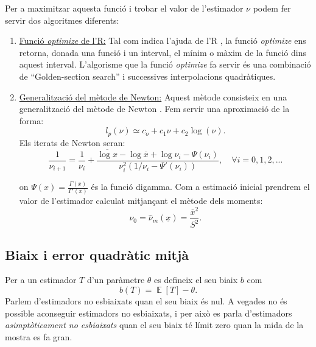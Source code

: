 \documentclass[12pt, catalan]{article}
\numberwithin{table}{section}
\numberwithin{figure}{section}
\numberwithin{equation}{section}
\DeclareMathOperator{\E}{\mathbb{E}}
\begin{document}
Per a maximitzar aquesta funció i trobar el valor de l'estimador $\nu$ podem fer servir dos algoritmes diferents:
\begin{enumerate}
  \item  \underline{Funció \textit{optimize} de l'R:}
  Tal com indica l'ajuda de l'R \cite{Rhelp}, la funció \textit{optimize} ens retorna, donada una funció i un interval, el mínim o màxim de la funció dins aquest interval. L'algorisme que la funció \textit{optimize} fa servir és una combinació de ``Golden-section search'' i successives interpolacions quadràtiques.

  
  \item  \underline{Generalització del mètode de Newton:}
  Aquest mètode consisteix en una generalització del mètode de Newton \cite{method}.
  Fem servir una aproximació de la forma:
  \begin{equation}
       l_p(\nu)\simeq c_o+c_1\nu+c_2\log(\nu).
  \end{equation}
  Els iterats de Newton seran:
  \begin{equation}
      \frac{1}{\nu_{i+1}}=\frac{1}{\nu_i}+\frac{\overline{\log x}-\log\overline{x}+\log\nu_i-\Psi(\nu_i)}{\nu_i^2(1/\nu_i-\Psi'(\nu_i))},\quad\forall i=0,1,2,...
      \label{Newton}
  \end{equation}

 on $\Psi(x)=\frac{\Gamma(x)}{\Gamma'(x)}$ és la funció digamma.
 Com a estimació inicial prendrem el valor de l'estimador calculat mitjançant el mètode dels moments: %
 \begin{equation*}
     \nu_0=\hat{\nu}_m(\underline{x})=\frac{\overline{x}^2}{S^2}.
 \end{equation*}
\end{enumerate}


\subsection{Biaix i error quadràtic mitjà}
Per a un estimador $T$ d'un paràmetre $\theta$ es defineix el seu biaix $b$ com
\begin{equation*}
    b(T) = \E{[T]}-\theta.
\end{equation*}
Parlem d'estimadors no esbiaixats quan el seu biaix és nul. A vegades no és possible aconseguir estimadors no esbiaixats, i per això es parla d'estimadors \emph{asimptòticament no esbiaixats} quan el seu biaix té límit zero quan la mida de la mostra es fa gran.
\end{document}
